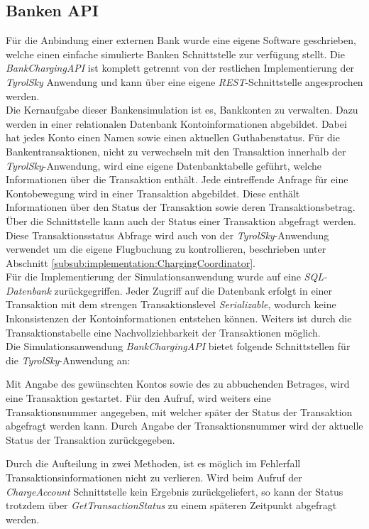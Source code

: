 \subsection{Banken API}
\label{subsec:implementation:bankApi}
Für die Anbindung einer externen Bank wurde eine eigene Software geschrieben, welche einen einfache simulierte Banken Schnittstelle zur verfügung stellt. Die \textit{BankChargingAPI} ist komplett getrennt von der restlichen Implementierung der \textit{TyrolSky} Anwendung und kann über eine eigene \textit{REST}-Schnittstelle angesprochen werden. \\
Die Kernaufgabe dieser Bankensimulation ist es, Bankkonten zu verwalten. Dazu werden in einer relationalen Datenbank Kontoinformationen abgebildet. Dabei hat jedes Konto einen Namen sowie einen aktuellen Guthabenstatus. Für die Bankentransaktionen, nicht zu verwechseln mit den Transaktion innerhalb der \textit{TyrolSky}-Anwendung, wird eine eigene Datenbanktabelle geführt, welche Informationen über die Transaktion enthält. Jede eintreffende Anfrage für eine Kontobewegung wird in einer Transaktion abgebildet. Diese enthält Informationen über den Status der Transaktion sowie deren Transaktionsbetrag. Über die Schnittstelle kann auch der Status einer Transaktion abgefragt werden. Diese Transaktionsstatus Abfrage wird auch von der \textit{TyrolSky}-Anwendung verwendet um die eigene Flugbuchung zu kontrollieren, beschrieben unter Abschnitt \ref{subsub:implementation:ChargingCoordinator}. \\
Für die Implementierung der Simulationsanwendung wurde auf eine \textit{SQL-Datenbank} zurückgegriffen. Jeder Zugriff auf die Datenbank erfolgt in einer Transaktion mit dem strengen Transaktionslevel \textit{Serializable}, wodurch keine Inkonsistenzen der Kontoinformationen entstehen können. Weiters ist durch die Transaktionstabelle eine Nachvollziehbarkeit der Transaktionen möglich. \\
Die Simulationsanwendung \textit{BankChargingAPI} bietet folgende Schnittstellen für die \textit{TyrolSky}-Anwendung an:
\begin{itemize}
        Mit Angabe des gewünschten Kontos sowie des zu abbuchenden Betrages, wird eine Transaktion gestartet. Für den Aufruf, wird weiters eine Transaktionsnummer angegeben, mit welcher später der Status der Transaktion abgefragt werden kann.
        Durch Angabe der Transaktionsnummer wird der aktuelle Status der Transaktion zurückgegeben. 
\end{itemize}
Durch die Aufteilung in zwei Methoden, ist es möglich im Fehlerfall Transaktionsinformationen nicht zu verlieren. Wird beim Aufruf der \textit{ChargeAccount} Schnittstelle kein Ergebnis zurückgeliefert, so kann der Status trotzdem über \textit{GetTransactionStatus} zu einem späteren Zeitpunkt abgefragt werden.

